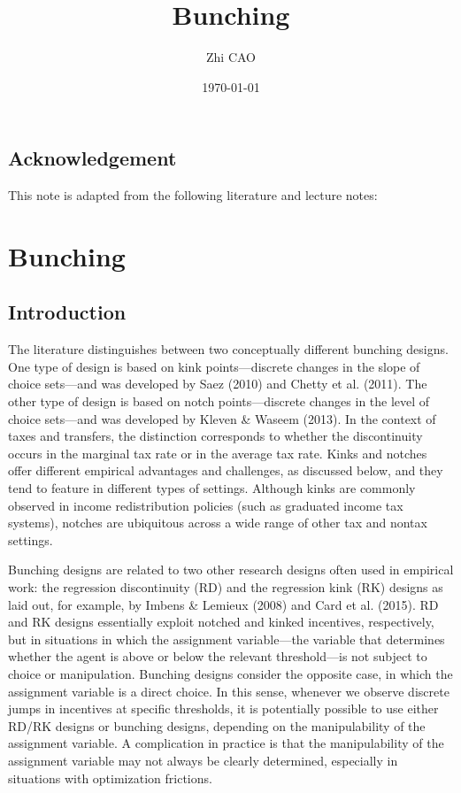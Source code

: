 \documentclass[11pt]{book}%
\begin{document}
\title{Bunching}

\author{Zhi  CAO}

\date{
\today
}

\maketitle

\newpage
\section*{Acknowledgement}
 This note is adapted from the following literature and lecture notes:

	\thispagestyle{empty}
\newpage
\tableofcontents

\newpage
{}

\chapter{Bunching}
\section{Introduction}
The literature distinguishes between two conceptually different bunching designs. One type of design is based on kink points—discrete changes in the slope of choice sets—and was developed by Saez (2010) and Chetty et al. (2011). The other type of design is based on notch points—discrete changes in the level of choice sets—and was developed by Kleven \& Waseem (2013). In the context of taxes and transfers, the distinction corresponds to whether the discontinuity occurs in the marginal tax rate or in the average tax rate. Kinks and notches offer different empirical advantages and challenges, as discussed below, and they tend to feature in different types of settings. Although kinks are commonly observed in income redistribution policies (such as graduated income tax systems), notches are ubiquitous across a wide range of other tax and nontax settings.

Bunching designs are related to two other research designs often used in empirical work: the regression discontinuity (RD) and the regression kink (RK) designs as laid out, for example, by Imbens \& Lemieux (2008) and Card et al. (2015). RD and RK designs essentially exploit notched and kinked incentives, respectively, but in situations in which the assignment variable—the variable that determines whether the agent is above or below the relevant threshold—is not subject to choice or manipulation. Bunching designs consider the opposite case, in which the assignment variable is a direct choice. In this sense, whenever we observe discrete jumps in incentives at specific thresholds, it is potentially possible to use either RD/RK designs or bunching designs, depending on the manipulability of the assignment variable. A complication in practice is that the manipulability of the assignment variable may not always be clearly determined, especially in situations with optimization frictions.
\end{document}
